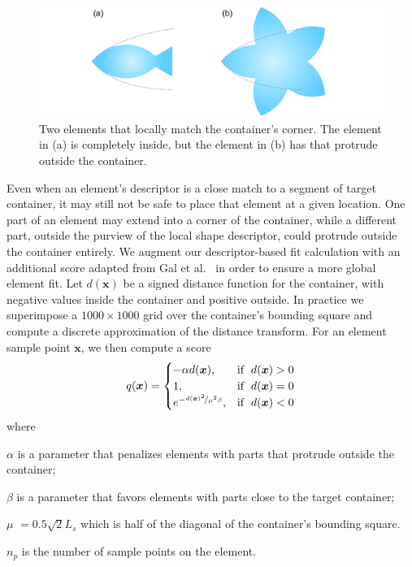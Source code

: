 \begin{figure}%
\centering
\includegraphics[width=1.0\textwidth]{figures/repulsionpak/shape_matching_score.pdf}
\caption[Global and local shape matching]{
  \label{fig_global_local}
  \newtext
  {
  Two elements that locally match the container's corner. 
  The element in (a) is completely inside, but the element in (b) has  that
  protrude outside the container.
  }
}
\end{figure}

Even when an element's descriptor is a close match to a segment of target container, 
it may still not be safe to place that element at a given location.
One part of an element may extend into a corner of the container,
while a different part, outside the purview of the local shape descriptor,
could protrude outside the container entirely.  We augment our 
descriptor-based fit calculation with an additional score adapted from
Gal et al.~\cite{Gal2007B} in order to ensure a more global element fit.
Let $d(\bm{x})$ be a signed distance function for the container, with
negative values inside the container and positive outside.  In practice we
superimpose a $1000\times 1000$ grid over the container's bounding square and
compute a discrete approximation of the distance transform.  For an element
sample point $\bm{x}$, we then compute a score
\begin{equation}
 q(\bm{x}) =\begin{cases}    
    - \alpha d(\bm{x}), & \mathrm{if}\;\; d(\bm{x}) > 0  \\    
    1, & \mathrm{if} \;\;d(\bm{x}) = 0 \\
    e^{-\nicefrac{d(\bm{x})^2}{\mu^2\beta}}, & \mathrm{if} \;\; d(\bm{x}) < 0
  \end{cases}
\end{equation}
where 
\begin{packeddescriptions}
  \item[$\alpha$] is a parameter that penalizes elements with parts that protrude outside the container;
  \item[$\beta$] is a parameter that favors elements with parts close to the target container;
  \item[$\mu$] $= 0.5 \sqrt{2}L_{s}$ which is half of the diagonal of the container's bounding square.
  \item[$n_p$] is the number of sample points on the element.
\end{packeddescriptions}


